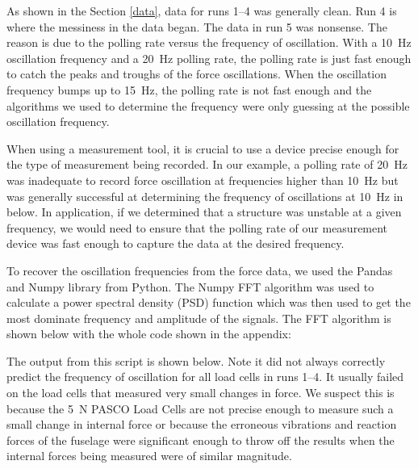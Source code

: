 \documentclass[12 pt]{report}
\begin{document}
As shown in the Section \ref{data}, data for runs \numrange{1}{4} was generally clean. Run \num{4} is where the messiness in the data began. The data in run \num{5} was nonsense. The reason is due to the polling rate versus the frequency of oscillation. With a \qty{10}{\hertz} oscillation frequency and a \qty{20}{\hertz} polling rate, the polling rate is just fast enough to catch the peaks and troughs of the force oscillations. When the oscillation frequency bumps up to \qty{15}{\hertz}, the polling rate is not fast enough and the algorithms we used to determine the frequency were only guessing at the possible oscillation frequency.

When using a measurement tool, it is crucial to use a device precise enough for the type of measurement being recorded. In our example, a polling rate of \qty{20}{\hertz} was inadequate to record force oscillation at frequencies higher than \qty{10}{\hertz} but was generally successful at determining the frequency of oscillations at \qty{10}{\hertz} in below. In application, if we determined that a structure was unstable at a given frequency, we would need to ensure that the polling rate of our measurement device was fast enough to capture the data at the desired frequency.

To recover the oscillation frequencies from the force data, we used the Pandas and Numpy library from Python. The Numpy FFT algorithm was used to calculate a power spectral density (PSD) function which was then used to get the most dominate frequency and amplitude of the signals. The FFT algorithm is shown below with the whole code shown in the appendix:



The output from this script is shown below. Note it did not always correctly predict the frequency of oscillation for all load cells in runs \numrange{1}{4}. It usually failed on the load cells that measured very small changes in force. We suspect this is because the \qty{5}{\newton} PASCO Load Cells are not precise enough to measure such a small change in internal force or because the erroneous vibrations and reaction forces of the fuselage were significant enough to throw off the results when the internal forces being measured were of similar magnitude.
\end{document}
